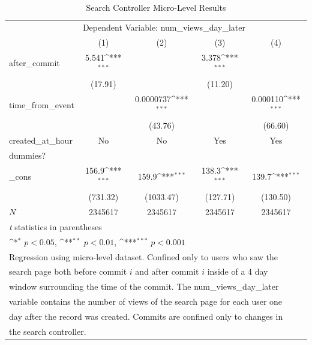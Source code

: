 \documentclass[10pt]{article}
\begin{document}
\begin{table}[h!]
\caption{Search Controller Micro-Level Results}
\centering
{
    \def\sym#1{\ifmmode^{#1}\else\(^{#1}\)\fi}
    \begin{tabular}{l*{4}{c}}
    \hline\hline
        & \multicolumn{4}{l}{Dependent Variable: num\_views\_day\_later} \\ 
        &\multicolumn{1}{c}{(1)}&\multicolumn{1}{c}{(2)}&\multicolumn{1}{c}{(3)}&\multicolumn{1}{c}{(4)}\\
        \hline
        after\_commit&       5.541\sym{***}&               &       3.378\sym{***}&                     \\
        &     (17.91)         &                     &     (11.20)         &                     \\
        [1em]
        time\_from\_event&                     &   0.0000737\sym{***}&                     &    0.000110\sym{***}\\
        &                    &     (43.76)         &                     &     (66.60)         \\
        [1em]
        created\_at\_hour&             No        &           No           &       Yes &      Yes \\
        dummies?&                     &                     &              &            \\
        [1em]
        \_cons      &       156.9\sym{***}&       159.9\sym{***}&       138.3\sym{***}&       139.7\sym{***}\\
        &    (731.32)     &   (1033.47)         &    (127.71)         &    (130.50)         \\
        \hline
        \(N\)       &     2345617       &     2345617         &     2345617         &     2345617         \\
        \hline\hline
        \multicolumn{5}{l}{\footnotesize \textit{t} statistics in parentheses}\\
        \multicolumn{5}{l}{\footnotesize \sym{*} \(p<0.05\), \sym{**} \(p<0.01\), \sym{***} \(p<0.001\)}\\
        \multicolumn{5}{l}{Regression using micro-level dataset. Confined only to users who saw the} \\
        \multicolumn{5}{l}{search page both before commit $i$ and after commit $i$ inside of a 4 day}\\
        \multicolumn{5}{l}{window surrounding the time of the commit. The num\_views\_day\_later} \\
        \multicolumn{5}{l}{variable contains the number of views of the search page for each user one}\\
        \multicolumn{5}{l}{day after the record was created. Commits are confined only to changes in} \\
        \multicolumn{5}{l}{the search controller.} 
        \end{tabular}
}
\label{table:search-micro-commit-results}
\end{table}
\end{document}
